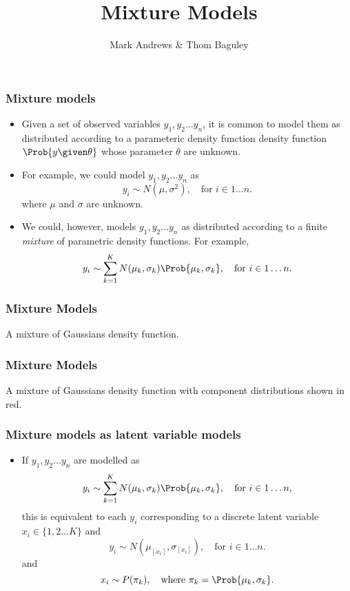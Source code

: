 \documentclass{slides}
\title[MCMC]{Mixture Models}
\author[Andrews]{Mark Andrews \& Thom Baguley}
\begin{document}
{
	\begin{frame}
		\titlepage
	\end{frame}
}


\begin{frame}
	\frametitle{Mixture models}
	\begin{itemize}

		\item Given a set of observed variables $y_1, y_2 \ldots y_n$,
			it is common to model them as distributed according to
			a parameteric density function density function
			$\Prob{y \given \theta}$ whose parameter $\theta$ are
			unknown.

		\item For example, we could model $y_1, y_2 \ldots y_n$ as 
			\[
				y_i \sim N(\mu, \sigma^2),\quad\text{for $i \in {1 \ldots n}$.}
			\]
		where $\mu$ and $\sigma$ are unknown.

	\item We could, however, models $y_1, y_2 \ldots y_n$ as distributed according to a finite \emph{mixture} of parametric density functions.
		For example, 
		\[
			y_i \sim \sum_{k=1}^K N(\mu_k, \sigma_k) \Prob{\mu_k, \sigma_k}, \quad\text{for $i \in {1 \ldots n}$.}
		\]
	

	\end{itemize}
	\end{frame}

	\begin{frame}
	\frametitle{Mixture Models}
	\noindent A mixture of Gaussians density function.
	\vspace{-2\baselineskip}
	\begin{center}
	
	\end{center}
	\end{frame}

	\begin{frame}
	\frametitle{Mixture Models}
	\noindent A mixture of Gaussians density function with component distributions shown in red.
	\vspace{-2\baselineskip}
	\begin{center}
	
	\end{center}
	\end{frame}

	\begin{frame}
	\frametitle{Mixture models as latent variable models}
	\begin{itemize}

	\item If $y_1, y_2 \ldots y_n$ are modelled as 
		\[
			y_i \sim \sum_{k=1}^K N(\mu_k, \sigma_k) \Prob{\mu_k, \sigma_k}, \quad\text{for $i \in {1 \ldots n}$,}
		\]
		this is equivalent to each $y_i$ corresponding to a discrete latent variable $x_i \in \{1, 2 \ldots K\}$ and
		\[
			y_i \sim N(\mu_{[x_i]}, \sigma_{[x_i]}),\quad\text{for $i \in {1 \ldots n}$.}
		\]
		and
		\[
			x_i \sim P(\pi_k), \quad\text{where $\pi_k = \Prob{\mu_k, \sigma_k}$}.
		\]
	
	\end{itemize}
	\end{frame}
\end{document}
